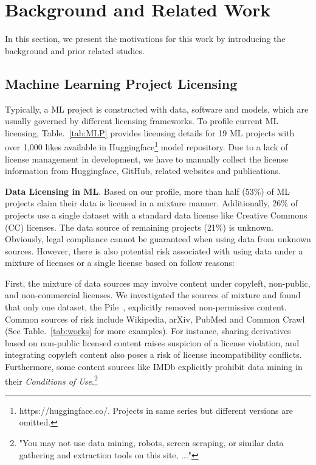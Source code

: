 \section{Background and Related Work}
In this section, we present the motivations for this work by introducing the background and prior related studies.

\subsection{Machine Learning Project Licensing}
Typically, a ML project is constructed with data, software and models, which are usually governed by different licensing frameworks.
To profile current ML licensing, Table.~\ref{tab:MLP} provides licensing details for 19 ML projects with over 1,000 likes available in Huggingface\footnote{https://huggingface.co/. Projects in same series but different versions are omitted.} model repository.
Due to a lack of license management in development, we have to manually collect the license information from Huggingface, GitHub, related websites and publications.

\textbf{Data Licensing in ML}.
Based on our profile, more than half (53\%) of ML projects claim their data is licensed in a mixture manner.
Additionally, 26\% of projects use a single dataset with a standard data license like Creative Commons (CC) licenses.
The data source of remaining projects (21\%) is unknown.
Obviously, legal compliance cannot be guaranteed when using data from unknown sources. 
However, there is also potential risk associated with using data under a mixture of licenses or a single license based on follow reasons:

First, the mixture of data sources may involve content under copyleft, non-public, and non-commercial licenses. 
We investigated the sources of mixture and found that only one dataset, the Pile~\cite{gao2020the}, explicitly removed non-permissive content.
Common sources of risk include Wikipedia, arXiv, PubMed and Common Crawl~\cite{henderson2023foundation} (See Table.~\ref{tab:works} for more examples).
For instance, sharing derivatives based on non-public licensed content raises suspicion of a license violation, and integrating copyleft content also poses a risk of license incompatibility conflicts.
Furthermore, some content sources like IMDb explicitly prohibit data mining in their \textit{Conditions of Use}.\footnote{"You may not use data mining, robots, screen scraping, or similar data gathering and extraction tools on this site, ..."}


